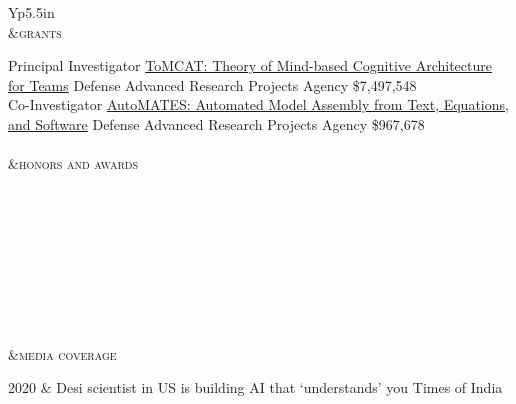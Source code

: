 \documentclass[final,oneside,12pt]{memoir}
\newcommand{\heading}[1]{%
  \\
  &{\Large\textsc{\MakeTextLowercase{#1}}}\\\addlinespace
  \cmidrule{2-2}\addlinespace
}
\begin{document}
\begin{ctabular}{Yp{5.5in}}
  \heading{Grants}
  {Principal Investigator}%
  {\href{https://ml4ai.github.io/tomcat}{ToMCAT: Theory of Mind-based Cognitive
  Architecture for Teams}}%
  {Defense Advanced Research Projects Agency}%
    {\$7,497,548}\\
  {Co-Investigator}%
  {\href{https://ml4ai.github.io/automates/}{AutoMATES: Automated Model Assembly from Text, Equations, and Software}}
  {Defense Advanced Research Projects Agency}%
    {\$967,678}\\\addlinespace
  \heading{Honors and Awards}
  \\
  \\
  \\
  \\
  \\
  \\
  \\
  \heading{Media Coverage}
  2020 &  
                {Desi scientist in US is building AI that `understands' you}
                {Times of India}\\


\end{ctabular}
\end{document}
